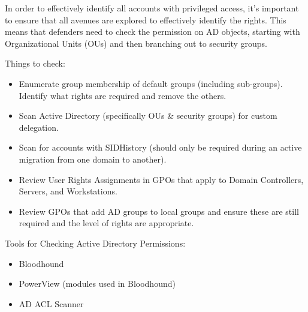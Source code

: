 In order to effectively identify all accounts with privileged access, it’s important to ensure that all avenues are explored to effectively identify the rights. This means that defenders need to check the permission on AD objects, starting with Organizational Units (OUs) and then branching out to security groups.

Things to check:

\begin{itemize}
    \item Enumerate group membership of default groups (including sub-groups). Identify what rights are required and remove the others.
    \item Scan Active Directory (specifically OUs \& security groups) for custom delegation.
    \item Scan for accounts with SIDHistory (should only be required during an active migration from one domain to another).
    \item Review User Rights Assignments in GPOs that apply to Domain Controllers, Servers, and Workstations.
    \item Review GPOs that add AD groups to local groups and ensure these are still required and the level of rights are appropriate.
\end{itemize}
Tools for Checking Active Directory Permissions:

\begin{itemize}
    \item Bloodhound
    \item PowerView (modules used in Bloodhound)
    \item AD ACL Scanner
\end{itemize}

 